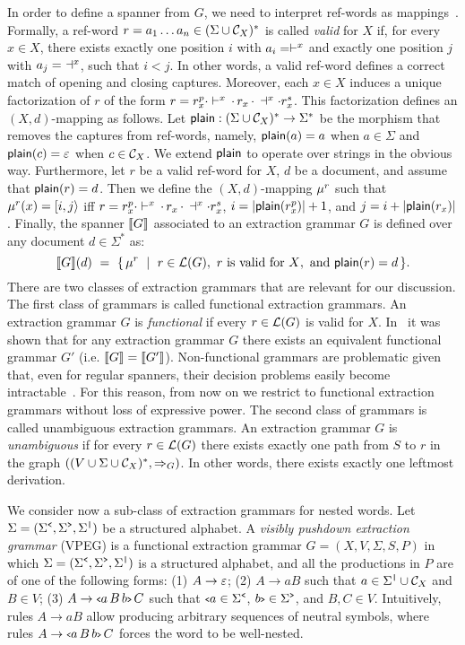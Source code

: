 In order to define a spanner from $G$, we need to interpret ref-words as mappings~\cite{Freydenberger19}. Formally, a ref-word $r = a_1 \ldots a_n \in (\Sigma \cup \mathcal{C}_{X})^*$ is called {\it valid} for $X$ if, for every $x \in X$, there exists exactly one position $i$ with $a_i = \vdash^{x}$ and exactly one position $j$ with $a_j = \ \dashv^{x}$, such that $i < j$. 
In other words, a valid ref-word defines a correct match of opening and closing captures. Moreover, each $x \in X$ induces a unique factorization of $r$ of the form $r = r_x^p \cdot \vdash^{x} \, \cdot \, r_x \, \cdot\, \dashv^{x} \cdot r_x^s$. 
This factorization defines an $(X,d)$-mapping as follows. 
Let $\textsf{plain}: (\Sigma \cup \mathcal{C}_{X})^* \rightarrow \Sigma^*$ be the morphism that removes the captures from ref-words, namely, $\textsf{plain}(a) = a$ when $a \in \Sigma$ and $\textsf{plain}(c) = \varepsilon$ when $c \in \mathcal{C}_{X}$.
We extend $\textsf{plain}$ to operate over strings in the obvious way.
Furthermore, let $r$ be a valid ref-word for $X$, $d$ be a document, and assume that $\textsf{plain}(r) = d$.
Then we define the $(X,d)$-mapping $\mu^r$ such that $\mu^r(x) = [i,j\rangle$ iff $r = r_x^p \cdot \vdash^{x} \, \cdot \, r_x \, \cdot\, \dashv^{x} \cdot r_x^s$, $i = |\textsf{plain}(r_x^p)|+1$, and $j = i + |\textsf{plain}(r_x)|$. 
Finally, the spanner ${\llbracket{G}\rrbracket}$ associated to an extraction grammar $G$ is defined over any document $d \in \Sigma^*$ as:
$$
{\llbracket{G}\rrbracket}(d) \ = \ \{ \, \mu^r \ \mid \ r \in \mathcal{L}(G), \text{ $r$ is valid for $X$}, \text{ and } \textsf{plain}(r) = d\, \}.
$$
There are two classes of extraction grammars that are relevant for our discussion.
The first class of grammars is called functional extraction grammars. 
An extraction grammar $G$ is \emph{functional} if every $r \in \mathcal{L}(G)$ is valid for $X$.  In~\cite{liatpaper} it was shown that for any extraction grammar $G$ there exists an equivalent functional grammar $G'$ (i.e. ${\llbracket{G}\rrbracket} = {\llbracket{G'}\rrbracket}$). Non-functional grammars are problematic given that, even for regular spanners, their decision problems easily become intractable~\cite{MaturanaRV18,FreydenbergerKP18}. For this reason, from now on we restrict to functional extraction grammars without loss of expressive power. 
The second class of grammars is called unambiguous extraction grammars. An extraction grammar $G$ is \emph{unambiguous} if for every $r \in \mathcal{L}(G)$ there exists exactly one path from $S$ to $r$ in the graph $((V \cup \Sigma \cup \mathcal{C}_{X})^*, \Rightarrow_{G})$. In other words, there exists exactly one leftmost derivation.

We consider now a sub-class of extraction grammars for nested words. Let $\Sigma = (\Sigma^{\texttt{<}}, \Sigma^{\texttt{>}}, \Sigma^{\texttt{|}})$ be a structured alphabet. A \emph{visibly pushdown extraction grammar} (VPEG) is a functional extraction grammar $G = (X, V, \Sigma, S, P)$ in which $\Sigma = (\Sigma^{\texttt{<}}, \Sigma^{\texttt{>}}, \Sigma^{\texttt{|}})$ is a structured alphabet, and all the productions in $P$ are of one of the following forms: (1) $A \rightarrow \varepsilon$; (2) $A \rightarrow a B$ such that $a \in \Sigma^{\texttt{|}} \cup \mathcal{C}_{X}$ and $B \in V$; (3) $A \rightarrow {\scriptsize\texttt{<}} a \, B \, b{\scriptsize\texttt{>}} \, C$ such that ${\scriptsize\texttt{<}} a \in \Sigma^{\texttt{<}}$, $b{\scriptsize\texttt{>}} \in \Sigma^{\texttt{>}}$, and $B, C \in V$. Intuitively, rules $A \rightarrow a B$ allow producing arbitrary sequences of neutral symbols, where rules $A \rightarrow {\scriptsize\texttt{<}} a \, B \, b{\scriptsize\texttt{>}} \, C$ forces the word to be well-nested. 

